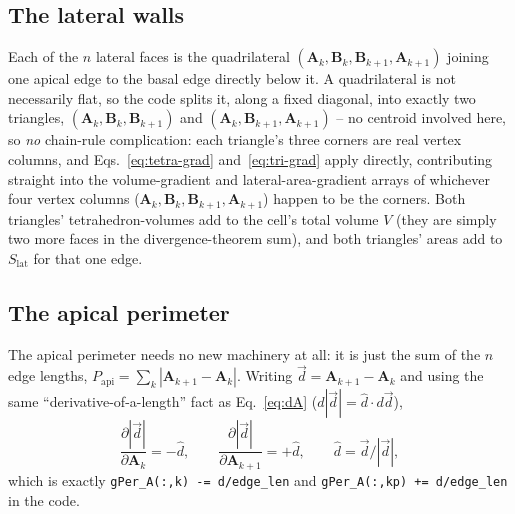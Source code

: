 \documentclass[11pt,a4paper]{report}
\newcommand{\Aarr}{\mathbf{A}}
\newcommand{\Barr}{\mathbf{B}}
\begin{document}
\subsection{The lateral walls}
\label{sec:lateral-walls}
Each of the $n$ lateral faces is the quadrilateral
$(\Aarr_k,\Barr_k,\Barr_{k+1},\Aarr_{k+1})$ joining one apical edge to the
basal edge directly below it. A quadrilateral is not necessarily flat,
so the code splits it, along a fixed diagonal, into exactly two
triangles, $(\Aarr_k,\Barr_k,\Barr_{k+1})$ and
$(\Aarr_k,\Barr_{k+1},\Aarr_{k+1})$ -- no centroid involved here, so
\emph{no} chain-rule complication: each triangle's three corners are
real vertex columns, and Eqs.~\ref{eq:tetra-grad} and~\ref{eq:tri-grad}
apply directly, contributing straight into the volume-gradient and
lateral-area-gradient arrays of whichever four vertex columns
($\Aarr_k,\Barr_k,\Barr_{k+1},\Aarr_{k+1}$) happen to be the corners.
Both triangles' tetrahedron-volumes add to the cell's total volume $V$
(they are simply two more faces in the divergence-theorem sum), and
both triangles' areas add to $S_{\mathrm{lat}}$ for that one edge.

\subsection{The apical perimeter}
\label{sec:apical-perim}
The apical perimeter needs no new machinery at all: it is just the sum
of the $n$ edge lengths, $P_{\mathrm{api}}=\sum_k |\Aarr_{k+1}-\Aarr_k|$.
Writing $\vec d = \Aarr_{k+1}-\Aarr_k$ and using the same
``derivative-of-a-length'' fact as Eq.~\ref{eq:dA} ($d|\vec d| = \hat
d\cdot d\vec d$),
\begin{equation}
  \frac{\partial |\vec d|}{\partial \Aarr_k} = -\hat d, \qquad
  \frac{\partial |\vec d|}{\partial \Aarr_{k+1}} = +\hat d, \qquad \hat d = \vec d/|\vec d|,
\end{equation}
which is exactly \texttt{gPer\_A(:,k) -= d/edge\_len} and
\texttt{gPer\_A(:,kp) += d/edge\_len} in the code.
\end{document}
